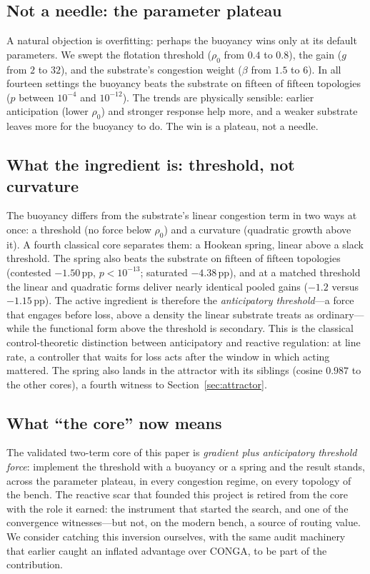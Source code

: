 \subsection{Not a needle: the parameter plateau}

A natural objection is overfitting: perhaps the buoyancy wins only at its
default parameters. We swept the flotation threshold ($\rho_0$ from $0.4$ to
$0.8$), the gain ($g$ from $2$ to $32$), and the substrate's congestion weight
($\beta$ from $1.5$ to $6$). In all fourteen settings the buoyancy beats the
substrate on fifteen of fifteen topologies ($p$ between $10^{-4}$ and
$10^{-12}$). The trends are physically sensible: earlier anticipation (lower
$\rho_0$) and stronger response help more, and a weaker substrate leaves more
for the buoyancy to do. The win is a plateau, not a needle.

\subsection{What the ingredient is: threshold, not curvature}

The buoyancy differs from the substrate's linear congestion term in two ways
at once: a threshold (no force below $\rho_0$) and a curvature (quadratic
growth above it). A fourth classical core separates them: a Hookean spring,
linear above a slack threshold. The spring also beats the substrate on fifteen
of fifteen topologies (contested $-1.50$\,pp, $p<10^{-13}$; saturated
$-4.38$\,pp), and at a matched threshold the linear and quadratic forms
deliver nearly identical pooled gains ($-1.2$ versus $-1.15$\,pp). The active
ingredient is therefore the \emph{anticipatory threshold}---a force that
engages before loss, above a density the linear substrate treats as
ordinary---while the functional form above the threshold is secondary. This is the classical control-theoretic distinction between anticipatory and reactive regulation: at line rate, a controller that waits for loss acts after the window in which acting mattered. The
spring also lands in the attractor with its siblings (cosine $0.987$ to the
other cores), a fourth witness to Section~\ref{sec:attractor}.

\subsection{What ``the core'' now means}

The validated two-term core of this paper is \emph{gradient plus anticipatory
threshold force}: implement the threshold with a buoyancy or a spring and the
result stands, across the parameter plateau, in every congestion regime, on
every topology of the bench. The reactive scar that founded this project is
retired from the core with the role it earned: the instrument that started the
search, and one of the convergence witnesses---but not, on the modern bench, a
source of routing value. We consider catching this inversion ourselves, with
the same audit machinery that earlier caught an inflated advantage over CONGA,
to be part of the contribution.
